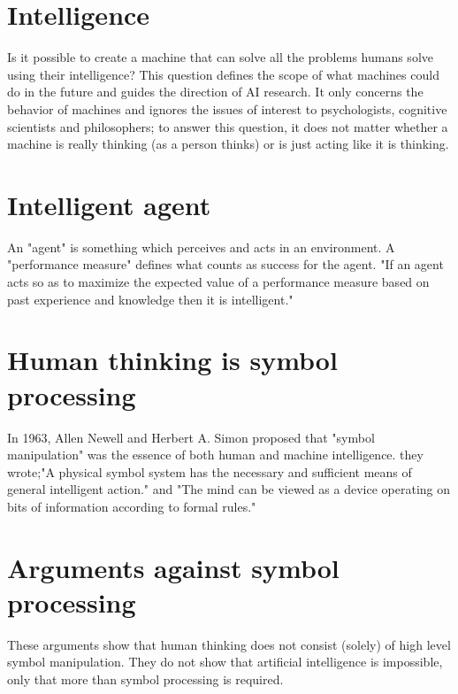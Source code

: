 \documentclass[10pts]{article}
\begin{document}
\section{Intelligence}
Is it possible to create a machine that can solve all the problems humans solve using their intelligence? This question defines the scope of what machines could do in the future and guides the direction of AI research. It only concerns the behavior of machines and ignores the issues of interest to psychologists, cognitive scientists and philosophers; to answer this question, it does not matter whether a machine is really thinking (as a person thinks) or is just acting like it is thinking.\\
\section{Intelligent agent}
An "agent" is something which perceives and acts in an environment. A "performance measure" defines what counts as success for the agent. "If an agent acts so as to maximize the expected value of a performance measure based on past experience and knowledge then it is intelligent."\\
\section{Human thinking is symbol processing}
In 1963, Allen Newell and Herbert A. Simon proposed that "symbol manipulation" was the essence of both human and machine intelligence. they wrote;"A physical symbol system has the necessary and sufficient means of general intelligent action." and "The mind can be viewed as a device operating on bits of information according to formal rules."\\
\section{Arguments against symbol processing}
These arguments show that human thinking does not consist (solely) of high level symbol manipulation. They do not show that artificial intelligence is impossible, only that more than symbol processing is required.
\end{document}
